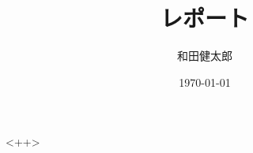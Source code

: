 \documentclass[a4paper]{jarticle}
\title{レポート}
\author{和田健太郎}
\date{\today}
\begin{document}
\maketitle
<++>


\begin{thebibliography}{99}
  \bibitem{}
\end{thebibliography}
\end{document}
